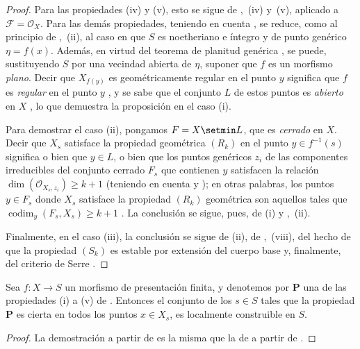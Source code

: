 \begin{proof}
\label{IV.9.9.4-proof}
Para las propiedades (iv) y (v), esto se sigue de ,~(iv) y~(v), aplicado a $\mathcal F=\mathcal O_X$.
Para las demás propiedades, teniendo en cuenta , se reduce, como al principio de ,~(ii), al caso en que $S$ es noetheriano e íntegro y de punto genérico $\eta=f(x)$.
Además, en virtud del teorema de planitud genérica , se puede, sustituyendo $S$ por una vecindad abierta de $\eta$, suponer que $f$ es un morfismo \emph{plano}.
Decir que $X_{f(y)}$ es geométricamente regular en el punto $y$ significa que $f$ es \emph{regular} en el punto $y$ , y se sabe que el conjunto $L$ de estos puntos es \emph{abierto} en $X$ , lo que demuestra la proposición en el caso (i).

Para demostrar el caso (ii), pongamos $F=X\setmin L$, que es \emph{cerrado} en $X$.
Decir que $X_s$
satisface la propiedad geométrica $(R_k)$ en el punto $y\in f^{-1}(s)$ significa o bien que $y\in L$, o bien que los puntos genéricos $z_i$ de las componentes irreducibles del conjunto cerrado $F_s$ que contienen $y$ satisfacen la relación $\dim(\mathcal O_{X_s,z_i})\geq k+1$ (teniendo en cuenta  y ); en otras palabras, los puntos $y\in F_s$ donde $X_s$ satisface la propiedad $(R_k)$ geométrica son aquellos tales que $\operatorname{codim}_y(F_s,X_s)\geq k+1$ .
La conclusión se sigue, pues, de (i) y ,~(ii).

Finalmente, en el caso (iii), la conclusión se sigue de (ii), de ,~(viii), del hecho de que la propiedad $(S_k)$ es estable por extensión del cuerpo base  y, finalmente, del criterio de Serre .
\end{proof}

\begin{corollary}[9.9.5]
\label{IV.9.9.5}
Sea $f:X\to S$ un morfismo de presentación finita, y denotemos por $\boldsymbol{P}$ una de las propiedades \textup{(i)} a \textup{(v)} de .
Entonces el conjunto de los $s\in S$ tales que la propiedad $\boldsymbol{P}$ es cierta en todos los puntos $x\in X_s$, es localmente construible en $S$.
\end{corollary}

\begin{proof}
\label{IV.9.9.5-proof}
La demostración a partir de  es la misma que la de  a partir de .
\end{proof}

